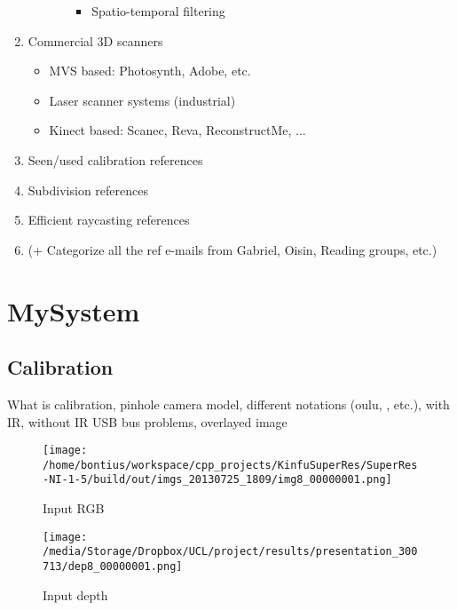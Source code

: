 \documentclass{ucl_thesis}
\begin{document}
\begin{enumerate}
\begin{itemize}
\begin{itemize}
\begin{itemize}
					\item Spatio-temporal filtering
					
				\end{itemize}
			\end{itemize}
		\end{itemize}
		
		\item Commercial 3D scanners
		\begin{itemize}
			\item MVS based: Photosynth, Adobe, etc.
			\item Laser scanner systems (industrial)
			\item Kinect based: Scanec, Reva, ReconstructMe, ...
		\end{itemize}
		
		\item Seen/used calibration references
		\item Subdivision references
		\item Efficient raycasting references
		\item (+ Categorize all the ref e-mails from Gabriel, Oisin, Reading groups, etc.)
	
	\end{enumerate}

\chapter{MySystem} 
\label{chp:my_system}

\section{Calibration}
\label{sec:calibration}

What is calibration, pinhole camera model, different notations (oulu, \citep{Zhang00}, etc.), 
with IR, without IR
USB bus problems, overlayed image

\begin{figure}[h!]\centering
    \begin{minipage}[b]{0.49\linewidth}
        \texttt{[image: /home/bontius/workspace/cpp\_projects/KinfuSuperRes/SuperRes-NI-1-5/build/out/imgs\_20130725\_1809/img8\_00000001.png]}
        \caption{Input RGB}
    \end{minipage}
    \begin{minipage}[b]{0.49\linewidth}
        \texttt{[image: /media/Storage/Dropbox/UCL/project/results/presentation\_300713/dep8\_00000001.png]}
		\caption{Input depth}
    \end{minipage}
\end{figure}
\end{document}
